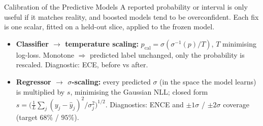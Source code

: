\documentclass[aspectratio=169]{beamer} %
\begin{document}
\begin{frame}{Calibration of the Predictive Models}
  A reported probability or interval is only useful if it matches reality, and
  boosted models tend to be \alert{overconfident}. Each fix is one scalar,
  fitted on a held-out slice, applied to the frozen model.
  \begin{itemize}
    \item \textbf{Classifier $ \rightarrow$ temperature scaling:}
      $p_{\text{cal}} = \sigma\!\left(\sigma^{-1}(p)/T\right)$, $T$ minimising
      log-loss. Monotone $\Rightarrow$ predicted label unchanged, only the
      probability is rescaled. Diagnostic: ECE, before vs after.
    \item \textbf{Regressor $ \rightarrow$ $\sigma$-scaling:} every predicted $\sigma$ (in the space the
      model learns) is multiplied by $s$, minimising the Gaussian NLL; closed form
      $s = \bigl(\tfrac{1}{L}\sum_{j}(y_{j}-\hat y_{j})^{2}/\sigma_{j}^{2}\bigr)^{1/2}$.
      Diagnostics: ENCE and $\pm1\sigma$ / $\pm2\sigma$ coverage
      (target $68\%$ / $95\%$).
  \end{itemize}
\end{frame}
\end{document}
